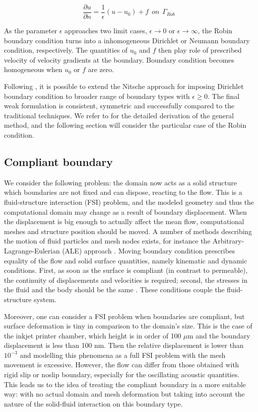 \begin{itemize}
  \begin{equation*}
     \frac{\partial u}{\partial n} = \frac{1}{\epsilon} (u - u_0) + f \ \ on \ \ \Gamma_{Rob}
  \end{equation*}
  
  As the parameter $\epsilon$ approaches two limit cases, $\epsilon \to 0$ or $\epsilon \to \infty$, the Robin boundary condition turns into a inhomogeneous Dirichlet or Neumann boundary condition, respectively. The quantities of $u_0$ and $f$ then play role of prescribed velocity of velocity gradients at the boundary. Boundary condition becomes homogeneous when $u_0$ or $f$ are zero.
  
  Following \cite{JuntunenS09}, it is possible to extend the Nitsche approach for imposing Dirichlet boundary condition \cite{Nitsche1971} to broader range of boundary types with $\epsilon \ge 0$. The final weak formulation is consistent, symmetric and successfully compared to the traditional techniques. We refer to \cite{JuntunenS09} for the detailed derivation of the general method, and the following section will consider the particular case of the Robin condition.
\end{itemize}  
  
\subsection{Compliant boundary}

We consider the following problem: the domain now acts as a solid structure which boundaries are not fixed and can dispose, reacting to the flow. This is a fluid-structure interaction (FSI) problem, and the modeled geometry and thus the computational domain may change as a result of boundary displacement. When the displacement is big enough to actually affect the mean flow, computational meshes and structure position should be moved. A number of methods describing the motion of fluid particles and mesh nodes exists, for instance the Arbitrary-Lagrange-Eulerian (ALE) approach \cite{Donea1982}. Moving boundary condition prescribes equality of the flow and solid surface quantities, namely kinematic and dynamic conditions. First, as soon as the surface is compliant (in contrast to permeable), the continuity of displacements and velocities is required; second, the stresses in the fluid and the body should be the same \cite{Donea2004}. These conditions couple the fluid-structure system.

Moreover, one can consider a FSI problem when boundaries are compliant, but surface deformation is tiny in comparison to the domain's size. This is the case of the inkjet printer chamber, which height is in order of 100 $\mu$m and the boundary displacement is less than 100 nm. Then the relative displacement is lower than $10^{-3}$ and modelling this phenomena as a full FSI problem with the mesh movement is excessive. However, the flow can differ from those obtained with rigid slip or noslip boundary, especially for the oscillating acoustic quantities. This leads us to the idea of treating the compliant boundary in a more suitable way: with no actual domain and mesh deformation but taking into account the nature of the solid-fluid interaction on this boundary type.

